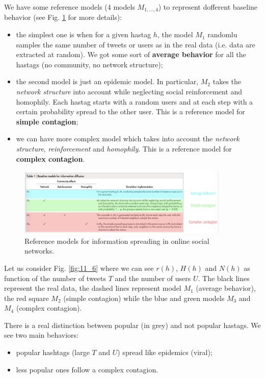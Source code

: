 \documentclass[../main/main.tex]{subfiles}
\begin{document}
We have some reference models (4 models \( M_{1, \dots,4} \)) to represent dofferent baseline behavior (see Fig. \ref{fig:11_5} for more details):

\begin{itemize}
\item the simplest one is when for a given hastag \( h \), the model \( M_1 \) randomlu samples the same number of tweets or users as in the real data (i.e. data are extracted at random). We got some sort of \textbf{average behavior} for all the hastags (no community, no network structure);

\item the second model is just an epidemic model. In particular, \( M_2 \) takes the \emph{network structure} into account while neglecting social reinforcement and homophily.  Each hastag starts with a random users and at each step with a certain probability spread to the other user. This is a reference model for \textbf{simple contagion};

\item we can have more complex model which takes into account the \emph{network structure}, \emph{reinforcement} and \emph{homophily}.  This is a reference model for \textbf{complex contagion}.
\end{itemize}

\begin{figure}[h!]
\centering
\includegraphics[width=0.9\textwidth]{../lessons/image/11/5.png}
\caption{\label{fig:11_5} Reference models for information spreading in online social networks.}
\end{figure}

Let us consider Fig. \ref{fig:11_6} where we can see \( r(h) \), \( H(h) \) and \( N(h) \) as function of the number of tweets \( T \) and the number of users \( U \).
The black lines represent the real data, the dashed lines represent model \( M_1 \) (average behavior), the red square \( M_2 \) (simple contagion) while the blue and green models \( M_3 \) and \( M_4 \) (complex contagion).

There is a real distinction between popular (in grey) and not popular hastags.
We see two main behaviors:
\begin{itemize}
\item popular hashtags (large $T$ and $U$) spread like epidemics (viral);
\item less popular ones follow a complex contagion.
\end{itemize}
\end{document}
